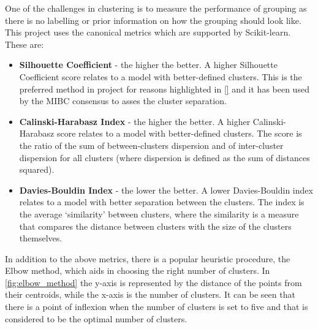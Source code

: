 One of the challenges in clustering is to measure the performance of grouping as there is no labelling or prior information on how the grouping should look like. This project uses the canonical metrics which are supported by Scikit-learn\cite{Pedregosa2011-ts,Scikit-learn_undated-ax}. These are:
\begin{itemize}
  \item \textbf{Silhouette Coefficient} - the higher the better. A higher Silhouette Coefficient score relates to a model with better-defined clusters. This is the preferred method in project for reasons highlighted in \ref{} and it has been used by the MIBC consensus \citet{Kamoun2020-tj} to asses the cluster separation.
  \item \textbf{Calinski-Harabasz Index} - the higher the better. A higher Calinski-Harabasz score relates to a model with better-defined clusters.  The score is the ratio of the sum of between-clusters dispersion and of inter-cluster dispersion for all clusters (where dispersion is defined as the sum of distances squared).
  \item \textbf{Davies-Bouldin Index} - the lower the better. A lower Davies-Bouldin index relates to a model with better separation between the clusters. The index is the average ‘similarity’ between clusters, where the similarity is a measure that compares the distance between clusters with the size of the clusters themselves.
\end{itemize}


In addition to the above metrics, there is a popular heuristic procedure, the Elbow method, which aids in choosing the right number of clusters. In \cref{fig:elbow_method} the y-axis is represented by the distance of the points from their centroids, while the x-axis is the number of clusters. It can be seen that there is a point of inflexion when the number of clusters is set to five and that is considered to be the optimal number of clusters.

